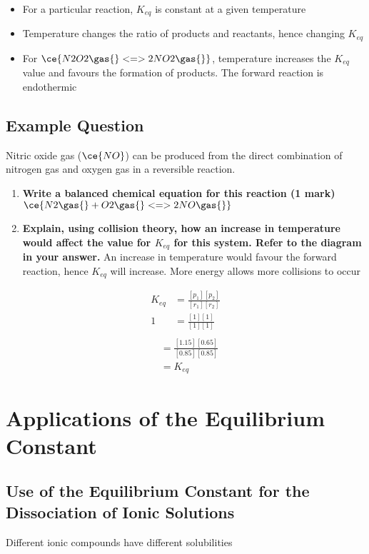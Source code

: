 	\begin{itemize}
		\item For a particular reaction, $K_{eq}$ is constant at a given temperature
		\item Temperature changes the ratio of products and reactants, hence changing $K_{eq}$
		\item For $\ce{N2O2 \gas{} <=> 2NO2 \gas{}}$, temperature increases the $K_{eq}$ value and favours the formation of products. The forward reaction is endothermic
	\end{itemize}

	\subsection{Example Question}
		Nitric oxide gas ($\ce{NO}$) can be produced from the direct combination of nitrogen gas and oxygen gas in a reversible reaction.
		\begin{enumerate}
			\item \textbf{Write a balanced chemical equation for this reaction (1 mark)}
				\subitem $\ce{N2 \gas{} + O2 \gas{} <=> 2NO \gas{}}$
			\item \textbf{Explain, using collision theory, how an increase in temperature would affect the value for $K_{eq}$ for this system. Refer to the diagram in your answer.}
				\subitem An increase in temperature would favour the forward reaction, hence $K_{eq}$ will increase. More energy allows more collisions to occur
		\end{enumerate}
	
		\begin{align*}
			K_{eq} &= \frac{[p_1][p_2]}{[r_1][r_2]} \\
			1 &= \frac{[1][1]}{[1][1]} \\
		\end{align*}
		\begin{align*}
			&= \frac{[1.15][0.65]}{[0.85][0.85]} \\
			&=K_{eq}
		\end{align*}

\section{Applications of the Equilibrium Constant} \label{12/11/2024}
	\subsection{Use of the Equilibrium Constant for the Dissociation of Ionic Solutions}
		Different ionic compounds have different solubilities

